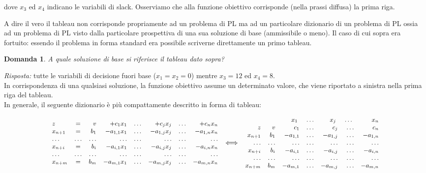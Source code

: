 \documentclass[10pt]{article}
\newtheorem{Dom}{Domanda}%
\begin{document}
dove $x_3$ ed $x_4$ indicano le variabili di slack.
Osserviamo che alla funzione obiettivo corrisponde 
(nella prassi diffusa) la prima riga.

A dire il vero il tableau non corrisponde propriamente
ad un problema di PL ma ad un particolare dizionario
di un problema di PL ossia ad un problema di PL
visto dalla particolare prospettiva di una sua soluzione di base
(ammissibile o meno).
Il caso di cui sopra era fortuito:
essendo il problema in forma standard era possibile
scriverne direttamente un primo tableau.

\begin{Dom}
   A quale soluzione di base si riferisce
   il tableau dato sopra?
\end{Dom}
{\em Risposta: \/}
tutte le variabili di decisione fuori base
($x_1 = x_2 = 0$) mentre $x_3=12$ ed $x_4=8$.\\

In corrispondenza di una qualsiasi soluzione,
la funzione obiettivo assume un determinato valore,
che viene riportato a sinistra nella prima riga del tableau.\\

In generale, il seguente dizionario \`e 
pi\`u compattamente descritto in forma di tableau:


\[ {\small
   \begin{array}{lcrrrrrr}
         z    &=& v & +c_1 x_1 & \ldots & +c_j x_j & \ldots &  +c_n x_n \\   
      x_{n+1} &=& b_1 & -a_{1,1}x_1 & \ldots & -a_{1,j}x_j & \ldots & -a_{1,n} x_n \\
      \ldots  &\ldots& \ldots  & \ldots & \ldots  & \ldots & \ldots  & \ldots \\
      x_{n+i} &=& b_i & -a_{i,1}x_1 & \ldots & -a_{i,j}x_j & \ldots & -a_{i,n} x_n \\
      \ldots  &\ldots& \ldots  & \ldots & \ldots  & \ldots & \ldots  & \ldots \\
      x_{n+m} &=& b_m & -a_{m,1}x_1 & \ldots & -a_{m,j}x_j & \ldots & -a_{m,n} x_n \\
   \end{array}
\hspace{0.2cm}
{\Huge \Longleftrightarrow}
\hspace{0.2cm}
   \begin{array}{rrrrrrr}
        &	  & x_1 \; & \ldots  & x_j \; & \ldots  \; & x_n\\
         z    & v & c_1 & \ldots & c_j & \ldots &  c_n \\        
      x_{n+1}  &  b_1 & -a_{1,1} & \ldots & -a_{1,j} & \ldots & -a_{1,n} \\
      \ldots  & \ldots  & \ldots & \ldots  & \ldots & \ldots  & \ldots \\
      x_{n+i}  &  b_i & -a_{i,1} & \ldots & -a_{i,j} & \ldots & -a_{i,n} \\
      \ldots  & \ldots  & \ldots & \ldots  & \ldots & \ldots  & \ldots \\
      x_{n+m}  &  b_m & -a_{m,1} & \ldots & -a_{m,j} & \ldots & -a_{m,n} \\
   \end{array}
  }
\]
\end{document}

